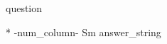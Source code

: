 \begin{question}
    {{ question }}

    \begin{tabular}{ *{ {{-num_column-}} }{S{m{\tabcolsep\relax}}} }
        {{ answer_string }}
    \end{tabular}
\end{question}